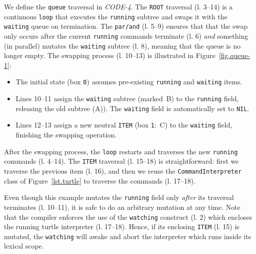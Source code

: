 \documentclass{sig-alternate}
\newcommand{\code}[1] {{\small{\texttt{#1}}}}
\newcommand{\MM}[1] {\textcircled{\tiny{\textsf{#1}}}}
\begin{document}
We define the \code{queue} traversal in \emph{CODE-4}.
%
The \code{ROOT} traversal (l. 3--14) is a continuous \code{loop} that 
executes the \code{running} subtree and swaps it with the \code{waiting} queue 
on termination.
The \code{par/and} (l. 5--9) ensures that that the swap only occurs after 
the current \code{running} commands terminate (l. 6) \emph{and} something (in 
parallel) mutates the \code{waiting} subtree (l. 8), meaning that the queue 
is no longer empty.
The swapping process (l. 10--13) is illustrated in Figure~\ref{fig.queue-1}: 
%
\begin{itemize}
%
\item The initial state (box \code{0}) assumes pre-existing \code{running} and 
\code{waiting} items.
%
\item Lines 10--11 assign the \code{waiting} subtree (marked~\MM{B}) to the 
\code{running} field, releasing the old subtree (\MM{A})).
The \code{waiting} field is automatically set to \code{NIL}.
%
\item Lines 12--13 assign a new neutral \code{ITEM} (box \code{1}:~\MM{C}) to 
the \code{waiting} field, finishing the swapping operation.
%
\end{itemize}
%
After the swapping process, the \code{loop} restarts and traverses the new 
\code{running} commands (l. 4--14).
%
The \code{ITEM} traversal (l. 15--18) is straightforward:
first we traverse the previous item (l. 16), and then we reuse the 
\code{CommandInterpreter} class of Figure~\ref{lst.turtle} to traverse the 
commands (l. 17--18).

Even though this example mutates the \code{running} field only \emph{after} its 
traversal terminates (l. 10--11), it is safe to do an arbitrary mutation at 
any time.
Note that the compiler enforces the use of the \code{watching} construct (l. 
2) which encloses the running turtle interpreter (l. 17--18).
Hence, if its enclosing \code{ITEM} (l. 15) is mutated, the \code{watching} 
will awake and abort the interpreter which runs inside its lexical scope.
\end{document}
